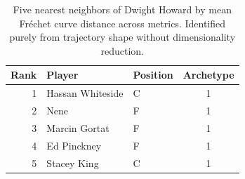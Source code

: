 \begin{table}[htbp]
  \centering\small
  \begin{tabular}{rllc}
    \toprule
    Rank & Player & Position & Archetype \\
    \midrule
    1 & Hassan Whiteside & C & 1 \\
    2 & Nene & F & 1 \\
    3 & Marcin Gortat & F & 1 \\
    4 & Ed Pinckney & F & 1 \\
    5 & Stacey King & C & 1 \\
    \bottomrule
  \end{tabular}
  \caption{Five nearest neighbors of Dwight Howard by mean Fr\'{e}chet curve distance across metrics. Identified purely from trajectory shape without dimensionality reduction.}
  \label{tab:Dwight_Howard_frechet_curve_neighbors}
\end{table}

